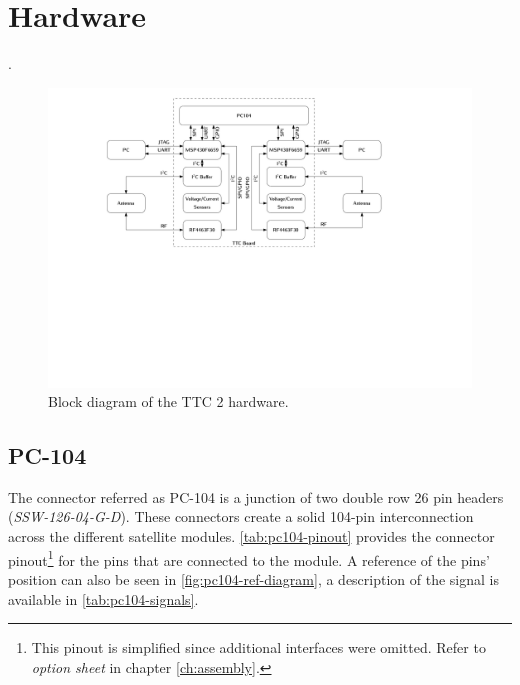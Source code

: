 %
%
%
%
%

%
%
%
%
%
%

\chapter{Hardware} \label{ch:hardware}

.

\begin{figure}[!h]
	\begin{center}
		\includegraphics[width=\textwidth]{figures/hardware_diagram.pdf}
		\caption{Block diagram of the TTC 2 hardware.}
		\label{fig:hardware-diagram}
	\end{center}
\end{figure}

\section{PC-104}

The connector referred as PC-104 is a junction of two double row 26 pin headers (\textit{SSW-126-04-G-D}). These connectors create a solid 104-pin interconnection across the different satellite modules. \autoref{tab:pc104-pinout} provides the connector pinout\footnote{This pinout is simplified since additional interfaces were omitted. Refer to \textit{option sheet} in chapter \ref{ch:assembly}.} for the pins that are connected to the module. A reference of the pins' position can also be seen in \autoref{fig:pc104-ref-diagram}, a description of the signal is available in \autoref{tab:pc104-signals}.


